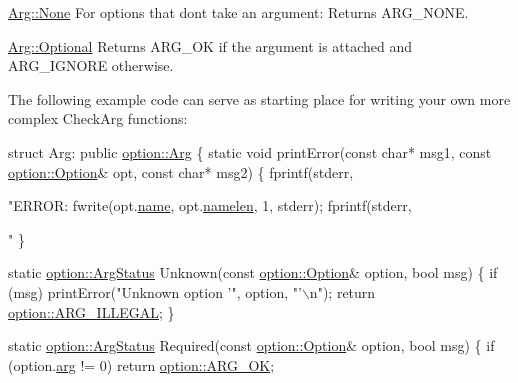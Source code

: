 \begin{DoxyItemize}
\item {\ttfamily \hyperlink{structoption_1_1_arg_a7fc01987899c91c6b6a1be5711a46e22}{Arg\+::\+None}} For options that don\textquotesingle{}t take an argument\+: Returns A\+R\+G\+\_\+\+N\+O\+NE. \item {\ttfamily \hyperlink{structoption_1_1_arg_aadb5316ecbc9eb0a7f0019d14bf35ad0}{Arg\+::\+Optional}} Returns A\+R\+G\+\_\+\+OK if the argument is attached and A\+R\+G\+\_\+\+I\+G\+N\+O\+RE otherwise.\end{DoxyItemize}
The following example code can serve as starting place for writing your own more complex Check\+Arg functions\+: 
\begin{DoxyCode}
\textcolor{keyword}{struct }Arg: \textcolor{keyword}{public} \hyperlink{structoption_1_1_arg}{option::Arg}
\{
  \textcolor{keyword}{static} \textcolor{keywordtype}{void} printError(\textcolor{keyword}{const} \textcolor{keywordtype}{char}* msg1, \textcolor{keyword}{const} \hyperlink{classoption_1_1_option}{option::Option}& opt, \textcolor{keyword}{const} \textcolor{keywordtype}{char}* msg2)
  \{
    fprintf(stderr, \textcolor{stringliteral}{"ERROR: %
    fwrite(opt.\hyperlink{classoption_1_1_option_a02a76b4896abd22d0ba8514362261de9}{name}, opt.\hyperlink{classoption_1_1_option_a3aa2957b19ad5815873441b415d56050}{namelen}, 1, stderr);
    fprintf(stderr, \textcolor{stringliteral}{"%
  \}

  \textcolor{keyword}{static} \hyperlink{namespaceoption_aee8c76a07877335762631491e7a5a1a9}{option::ArgStatus} Unknown(\textcolor{keyword}{const} \hyperlink{classoption_1_1_option}{option::Option}& option, \textcolor{keywordtype}{bool} msg)
  \{
    \textcolor{keywordflow}{if} (msg) printError(\textcolor{stringliteral}{"Unknown option '"}, option, \textcolor{stringliteral}{"'\(\backslash\)n"});
    \textcolor{keywordflow}{return} \hyperlink{namespaceoption_aee8c76a07877335762631491e7a5a1a9a9528e32563b795bd2930b12d0a5e382d}{option::ARG\_ILLEGAL};
  \}

  \textcolor{keyword}{static} \hyperlink{namespaceoption_aee8c76a07877335762631491e7a5a1a9}{option::ArgStatus} Required(\textcolor{keyword}{const} \hyperlink{classoption_1_1_option}{option::Option}& option, \textcolor{keywordtype}{bool} msg)
  \{
    \textcolor{keywordflow}{if} (option.\hyperlink{classoption_1_1_option_a402be734987458364b0f473acae36238}{arg} != 0)
      \textcolor{keywordflow}{return} \hyperlink{namespaceoption_aee8c76a07877335762631491e7a5a1a9a445e08cb1747e5a22929e7ef2da43b55}{option::ARG\_OK};

}}
\end{DoxyCode}

